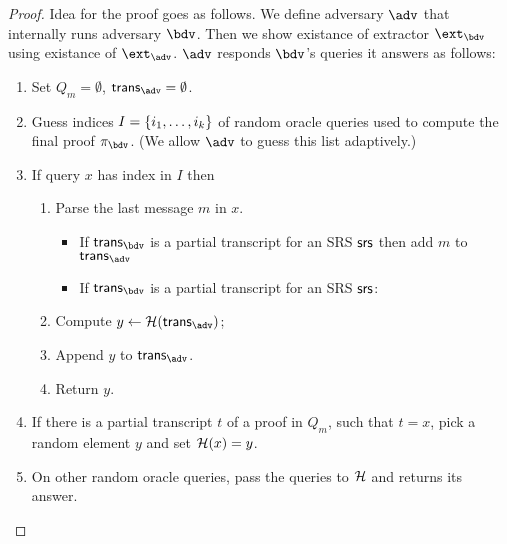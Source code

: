 \documentclass[runningheads,11pt]{llncs}
\begin{document}
\begin{proof}
  Idea for the proof goes as follows. We define adversary $\adv$ that  internally runs adversary $\bdv$. Then we show existance of extractor $\ext_\bdv$ using  existance of $\ext_\adv$. $\adv$ responds $\bdv$'s queries it answers as follows:
  \begin{enumerate}
  \item Set $Q_m = \emptyset$, $\tra = \emptyset$.
  \item Guess indices $I = \{i_1, \ldots, i_k\}$ of random oracle queries used to compute the final proof $\zkproofb$. (We allow $\adv$ to guess this list adaptively.)
  \item \label{it:used-transcript} If query $x$ has index in $I$ then
    \begin{enumerate}
    \item Parse the last message $m$ in $x$.
      \begin{itemize}
      \item If $\trb$ is a partial transcript for an SRS $\mathsf{srs}$ then add $m$ to $\tra$
      \item If $\trb$ is a partial transcript for an SRS $\mathsf{srs}$:
      \end{itemize}
    \item Compute $y \gets \ro(\tra)$;
    \item Append $y$ to $\tra$.
    \item Return $y$.
    \end{enumerate}
  \item \label{it:partial-transcript} If there is a partial transcript $t$ of a proof in $Q_m$, such that $t = x$, pick a random element $y$ and set $\mathcal{H}(x) = y$. 
  \item On other random oracle queries, pass the queries to $\mathcal{H}$ and returns its answer.

\end{enumerate}
\end{proof}
\end{document}
